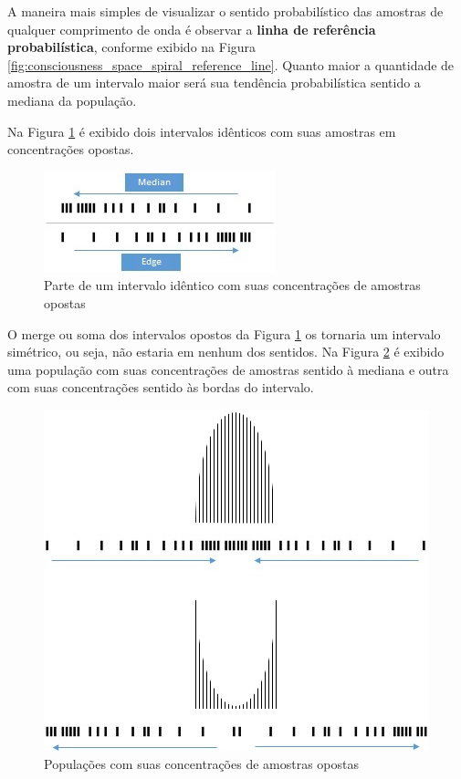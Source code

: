 A maneira mais simples de visualizar o sentido probabilístico das amostras de qualquer comprimento de onda é observar a \textbf{linha de referência probabilística}, conforme exibido na Figura \ref{fig:consciousness_space_spiral_reference_line}. Quanto maior a quantidade de amostra de um intervalo maior será sua tendência probabilística sentido a mediana da população.

Na Figura \ref{fig:consciousness_concentration_of_opposite_samples} é exibido dois intervalos idênticos com suas amostras em concentrações opostas.
	\begin{figure}[H]
	\caption{Parte de um intervalo idêntico com suas concentrações de amostras opostas}
	\label{fig:consciousness_concentration_of_opposite_samples}
	\centering
	\includegraphics[scale=1.2]{sections/images/consciousness_concentration_of_opposite_samples.jpg}
	\end{figure}

O merge ou soma dos intervalos opostos da Figura \ref{fig:consciousness_concentration_of_opposite_samples} os tornaria um intervalo simétrico, ou seja, não estaria em nenhum dos sentidos.
Na Figura \ref{fig:consciousness_concentration_of_opposite_samples_within_range} é exibido uma população com suas concentrações de amostras sentido à mediana e outra com suas concentrações sentido às bordas do intervalo.
	\begin{figure}[H]
	\caption{Populações com suas concentrações de amostras opostas}
	\label{fig:consciousness_concentration_of_opposite_samples_within_range}
	\centering
	\includegraphics[scale=.7]{sections/images/consciousness_concentration_of_opposite_samples_within_range.jpg}
	\end{figure}

